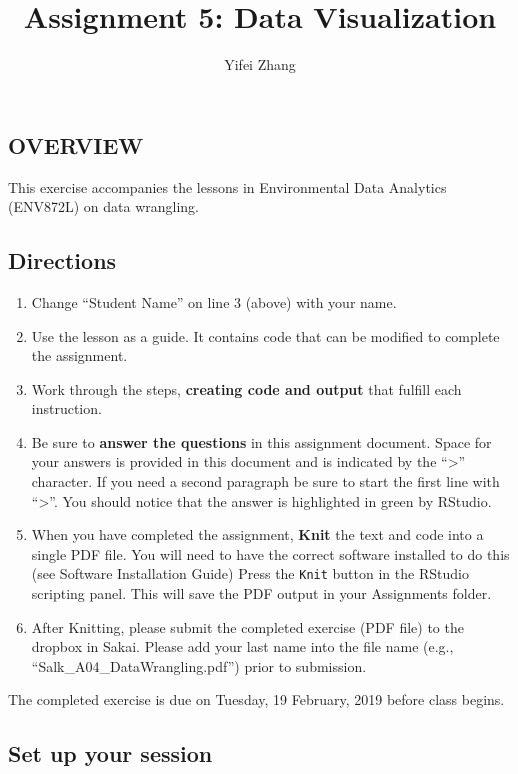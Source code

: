 \documentclass[]{article}
\title{Assignment 5: Data Visualization}
\author{Yifei Zhang}
\date{}
\providecommand{\tightlist}{%
  \setlength{\itemsep}{0pt}\setlength{\parskip}{0pt}}
\begin{document}
\maketitle

\subsection{OVERVIEW}\label{overview}

This exercise accompanies the lessons in Environmental Data Analytics
(ENV872L) on data wrangling.

\subsection{Directions}\label{directions}

\begin{enumerate}
\def\labelenumi{\arabic{enumi}.}
\tightlist
\item
  Change ``Student Name'' on line 3 (above) with your name.
\item
  Use the lesson as a guide. It contains code that can be modified to
  complete the assignment.
\item
  Work through the steps, \textbf{creating code and output} that fulfill
  each instruction.
\item
  Be sure to \textbf{answer the questions} in this assignment document.
  Space for your answers is provided in this document and is indicated
  by the ``\textgreater{}'' character. If you need a second paragraph be
  sure to start the first line with ``\textgreater{}''. You should
  notice that the answer is highlighted in green by RStudio.
\item
  When you have completed the assignment, \textbf{Knit} the text and
  code into a single PDF file. You will need to have the correct
  software installed to do this (see Software Installation Guide) Press
  the \texttt{Knit} button in the RStudio scripting panel. This will
  save the PDF output in your Assignments folder.
\item
  After Knitting, please submit the completed exercise (PDF file) to the
  dropbox in Sakai. Please add your last name into the file name (e.g.,
  ``Salk\_A04\_DataWrangling.pdf'') prior to submission.
\end{enumerate}

The completed exercise is due on Tuesday, 19 February, 2019 before class
begins.

\subsection{Set up your session}\label{set-up-your-session}
\end{document}
